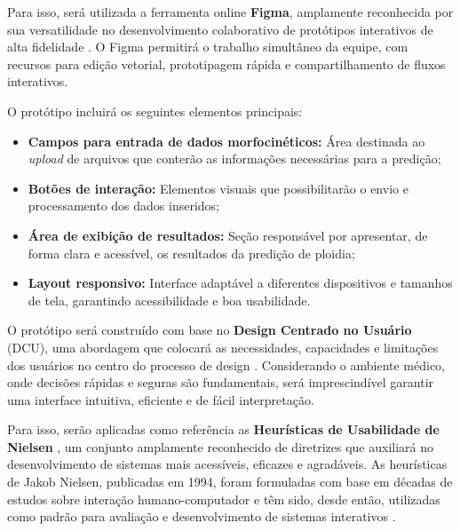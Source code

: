 Para isso, será utilizada a ferramenta online \textbf{Figma}, amplamente reconhecida por sua versatilidade no desenvolvimento colaborativo de protótipos interativos de alta fidelidade \cite{figma2024}. O Figma permitirá o trabalho simultâneo da equipe, com recursos para edição vetorial, prototipagem rápida e compartilhamento de fluxos interativos.

O protótipo incluirá os seguintes elementos principais:
\begin{itemize}
  \item \textbf{Campos para entrada de dados morfocinéticos:} Área destinada ao \textit{upload} de arquivos que conterão as informações necessárias para a predição;
  \item \textbf{Botões de interação:} Elementos visuais que possibilitarão o envio e processamento dos dados inseridos;
  \item \textbf{Área de exibição de resultados:} Seção responsável por apresentar, de forma clara e acessível, os resultados da predição de ploidia;
  \item \textbf{Layout responsivo:} Interface adaptável a diferentes dispositivos e tamanhos de tela, garantindo acessibilidade e boa usabilidade.
\end{itemize}

O protótipo será construído com base no \textbf{Design Centrado no Usuário} (DCU), uma abordagem que colocará as necessidades, capacidades e limitações dos usuários no centro do processo de design \cite{norman2013design}. Considerando o ambiente médico, onde decisões rápidas e seguras são fundamentais, será imprescindível garantir uma interface intuitiva, eficiente e de fácil interpretação.

Para isso, serão aplicadas como referência as \textbf{Heurísticas de Usabilidade de Nielsen} \cite{nielsen1994}, um conjunto amplamente reconhecido de diretrizes que auxiliará no desenvolvimento de sistemas mais acessíveis, eficazes e agradáveis. As heurísticas de Jakob Nielsen, publicadas em 1994, foram formuladas com base em décadas de estudos sobre interação humano-computador e têm sido, desde então, utilizadas como padrão para avaliação e desenvolvimento de sistemas interativos \cite{molich1990improving}.

